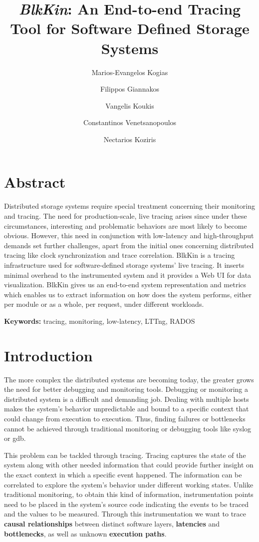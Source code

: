 \documentclass[a4paper,10pt,twocolumn]{article}
\begin{document}
\title{\emph{BlkKin}: An End-to-end Tracing Tool for Software Defined Storage 
Systems}
\author[1]{Marios-Evangelos Kogias}
\author[1]{Filippos Giannakos}
\author[1]{Vangelis Koukis}
\author[2]{Constantinos Venetsanopoulos}
\author[1]{Nectarios Koziris}
\date{}
\maketitle

\section*{Abstract}
Distributed storage systems require special treatment concerning their
monitoring and tracing. The need for production-scale, live tracing arises
since under these circumstances, interesting and problematic behaviors are most
likely to become obvious. However, this need in conjunction with low-latency
and high-throughput demands set further challenges, apart from the initial ones
concerning distributed tracing like clock synchronization and trace
correlation.  BlkKin is a tracing infrastructure used for software-defined
storage systems' live tracing. It inserts minimal overhead to the instrumented
system and it provides a Web UI for data visualization. BlkKin gives us an
end-to-end system representation and metrics which enables us to extract
information on how does the system performs, either per module or as a whole,
per request, under different workloads. 


\textbf{Keywords: } tracing, monitoring, low-latency, LTTng, RADOS

\section{Introduction}

The more complex the distributed systems are becoming today, the greater grows
the need for better debugging and monitoring tools. Debugging or monitoring a
distributed system is a difficult and demanding job. Dealing with multiple hosts
makes the system's behavior unpredictable and bound to a specific context that
could change from execution to execution. Thus, finding failures or bottlenecks
cannot be achieved through traditional monitoring or debugging tools like syslog
or gdb.  

This problem can be tackled through tracing. Tracing captures the state of the
system along with other needed information that could provide further insight
on the exact context in which a specific event happened. The information can be
correlated to explore the system's behavior under different working states.
Unlike traditional monitoring, to obtain this kind of information,
instrumentation points need to be placed in the system's source code indicating
the events to be traced and the values to be measured. Through this
instrumentation we want to trace \textbf{causal relationships} between distinct
software layers, \textbf{latencies} and \textbf{bottlenecks}, as well as
unknown \textbf{execution paths}.
\end{document}
